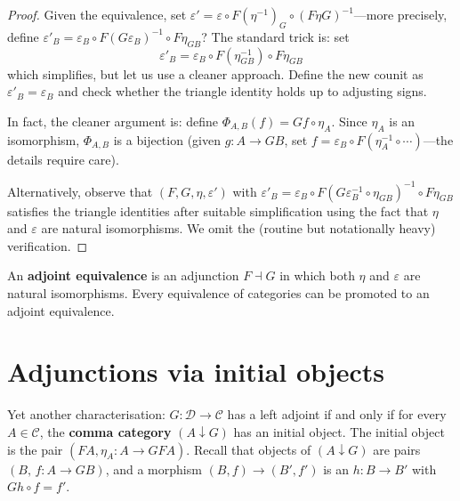 \begin{proof}
Given the equivalence, set $\varepsilon' = \varepsilon \circ F(\eta^{-1})_{G}
\circ (F\eta G)^{-1}$---more precisely, define
$\varepsilon'_B = \varepsilon_B \circ F(G\varepsilon_B)^{-1} \circ F\eta_{GB}$?
The standard trick is: set
\[
    \varepsilon'_B = \varepsilon_B \circ F(\eta^{-1}_{GB}) \circ F\eta_{GB}
\]
which simplifies, but let us use a cleaner approach.
Define the new counit as
$\varepsilon'_B = \varepsilon_B$ and check whether the triangle
identity holds up to adjusting signs.

In fact, the cleaner argument is: define $\Phi_{A,B}(f) = Gf\circ\eta_A$.
Since $\eta_A$ is an isomorphism, $\Phi_{A,B}$ is a bijection
(given $g\colon A\to GB$, set $f = \varepsilon_B\circ F(\eta_A^{-1}\circ
\cdots)$---the details require care).

Alternatively, observe that $(F,G,\eta,\varepsilon')$ with
$\varepsilon'_B = \varepsilon_B\circ F(G\varepsilon_B^{-1}\circ\eta_{GB})^{-1}
\circ F\eta_{GB}$ satisfies the triangle identities
after suitable simplification using the fact that $\eta$ and $\varepsilon$
are natural isomorphisms.  We omit the (routine but notationally heavy)
verification.
\end{proof}

\begin{remark}\label{rem:adjoint-equivalence}
An \textbf{adjoint equivalence} is an adjunction $F\dashv G$ in which
both $\eta$ and $\varepsilon$ are natural isomorphisms.
Every equivalence of categories can be promoted to an adjoint equivalence.
\end{remark}


\section{Adjunctions via initial objects}\label{sec:adj-comma}

\begin{remark}\label{rem:adj-comma-cat}
Yet another characterisation: $G\colon\mathcal{D}\to\mathcal{C}$ has a
left adjoint if and only if for every $A\in\mathcal{C}$, the
\textbf{comma category} $(A\downarrow G)$ has an initial object.
The initial object is the pair $(FA,\eta_A\colon A\to GFA)$.
Recall that objects of $(A\downarrow G)$ are pairs $(B,\,f\colon A\to GB)$,
and a morphism $(B,f)\to(B',f')$ is an $h\colon B\to B'$ with
$Gh\circ f = f'$.
\end{remark}


